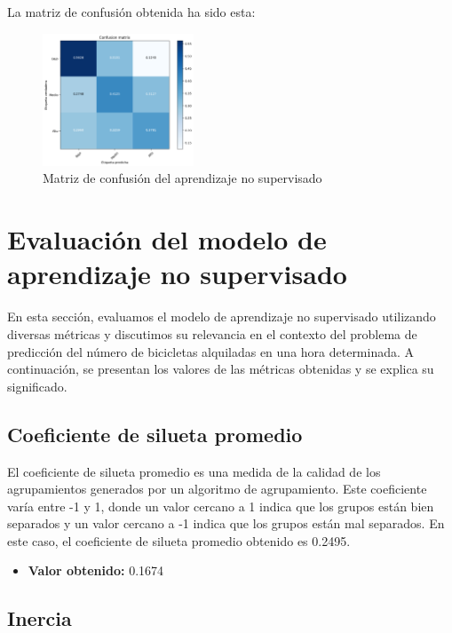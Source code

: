 \documentclass{wsdcr}
\begin{document}
La matriz de confusión obtenida ha sido esta:
\begin{figure}[h]
    \centering
    \includegraphics[width=0.4\textwidth]{charts/normalized/kmn_matrix_confussion.png}
    \caption{Matriz de confusión del aprendizaje no supervisado}
    \label{fig:kmnmatrizconfussion}
\end{figure}

\section{Evaluación del modelo de aprendizaje no supervisado}

En esta sección, evaluamos el modelo de aprendizaje no supervisado utilizando diversas métricas y discutimos su relevancia en el contexto del problema de predicción del número de bicicletas alquiladas en una hora determinada. A continuación, se presentan los valores de las métricas obtenidas y se explica su significado.

\subsection{Coeficiente de silueta promedio}

El coeficiente de silueta promedio es una medida de la calidad de los agrupamientos generados por un algoritmo de agrupamiento. Este coeficiente varía entre -1 y 1, donde un valor cercano a 1 indica que los grupos están bien separados y un valor cercano a -1 indica que los grupos están mal separados. En este caso, el coeficiente de silueta promedio obtenido es 0.2495.

\begin{itemize}
    \item \textbf{Valor obtenido:} 0.1674
\end{itemize}

\subsection{Inercia}
\end{document}
